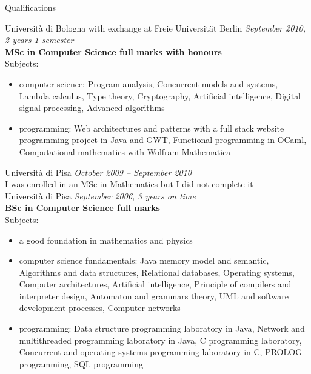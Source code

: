 \documentclass{resume}
\begin{document}
  \begin{rSection}{Qualifications} 

    Universit\`a di Bologna with exchange at Freie Universit\"at Berlin \hfill {\em September 2010, 2 years 1 semester} \\
    {\bf MSc in Computer Science full marks with honours}\\
    Subjects:
    \begin{itemize}
      \item computer science: 
        Program analysis, Concurrent models and systems, Lambda calculus,
	    Type theory, Cryptography, Artificial intelligence, Digital signal processing,
	    Advanced algorithms
      \item programming:
       Web architectures and patterns with a full stack website programming project in Java and GWT, 
	    Functional programming in OCaml, Computational mathematics with Wolfram Mathematica\\
    \end{itemize}
 
    
    Universit\`a di Pisa \hfill {\em October 2009 -- September 2010} \\
    I was enrolled in an MSc in Mathematics but I did not complete it\\

    Universit\`a di Pisa \hfill {\em September 2006, 3 years on time} \\
    {\bf BSc in Computer Science full marks}\\
    Subjects:
    \begin{itemize}
    \item a good foundation in mathematics and physics
    \item computer science fundamentals: 
      Java memory model and semantic, Algorithms and data structures, Relational databases,
	  Operating systems, Computer architectures, Artificial intelligence, Principle of compilers and interpreter design,
	  Automaton and grammars theory, UML and software development processes, Computer networks
    \item programming: 
      Data structure programming laboratory in Java, Network and multithreaded programming laboratory in Java,
	  C programming laboratory, Concurrent and operating systems programming laboratory in C,
	  PROLOG programming, SQL programming
    \end{itemize}



\end{rSection}
\end{document}

